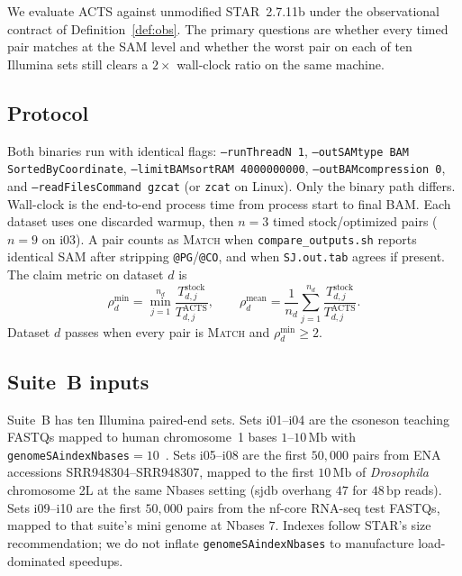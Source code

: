 \documentclass[11pt]{article}
\newcommand{\STAR}{STAR\xspace}
\newcommand{\ACTS}{ACTS\xspace}
\begin{document}
We evaluate \ACTS against unmodified \STAR~2.7.11b under the observational
contract of Definition~\ref{def:obs}.
The primary questions are whether every timed pair matches at the SAM level and
whether the worst pair on each of ten Illumina sets still clears a
$2\times$ wall-clock ratio on the same machine.

\subsection{Protocol}
\label{sec:protocol}

Both binaries run with identical flags:
\texttt{--runThreadN 1},
\texttt{--outSAMtype BAM SortedByCoordinate},
\texttt{--limitBAMsortRAM 4000000000},
\texttt{--outBAMcompression 0},
and \texttt{--readFilesCommand gzcat} (or \texttt{zcat} on Linux).
Only the binary path differs.
Wall-clock is the end-to-end process time from process start to final BAM.
Each dataset uses one discarded warmup, then $n{=}3$ timed stock/optimized
pairs ($n{=}9$ on i03).
A pair counts as \textsc{Match} when
\texttt{compare\_outputs.sh} reports identical SAM after stripping
\texttt{@PG}/\texttt{@CO}, and when \texttt{SJ.out.tab} agrees if present.
The claim metric on dataset $d$ is
\begin{equation}
\label{eq:minpair}
\rho^{\min}_d=\min_{j=1}^{n_d}\frac{T^{\mathrm{stock}}_{d,j}}{T^{\mathrm{ACTS}}_{d,j}},
\qquad
\rho^{\mathrm{mean}}_d=\frac{1}{n_d}\sum_{j=1}^{n_d}
\frac{T^{\mathrm{stock}}_{d,j}}{T^{\mathrm{ACTS}}_{d,j}}.
\end{equation}
Dataset $d$ passes when every pair is \textsc{Match} and
$\rho^{\min}_d\ge 2$.

\subsection{Suite~B inputs}
\label{sec:suiteb}

Suite~B has ten Illumina paired-end sets.
Sets i01--i04 are the csoneson teaching FASTQs mapped to human chromosome~1
bases $1$--$10\,\mathrm{Mb}$ with
\texttt{genomeSAindexNbases}${}=10$~\cite{csoneson2019rnaseq,himes2014airway}.
Sets i05--i08 are the first $50{,}000$ pairs from ENA accessions
SRR948304--SRR948307, mapped to the first $10\,\mathrm{Mb}$ of
\emph{Drosophila} chromosome 2L at the same Nbases setting
(sjdb overhang $47$ for $48\,\mathrm{bp}$ reads).
Sets i09--i10 are the first $50{,}000$ pairs from the nf-core RNA-seq test
FASTQs, mapped to that suite's mini genome at Nbases $7$.
Indexes follow \STAR's size recommendation; we do not inflate
\texttt{genomeSAindexNbases} to manufacture load-dominated speedups.
\end{document}
